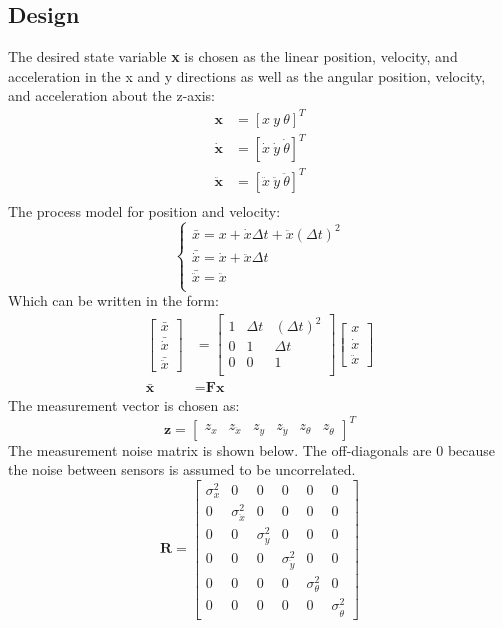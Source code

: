 \documentclass[12pt,letterpaper,titlepage]{report}
\begin{document}
\subsection{Design}
The desired state variable \textbf{x} is chosen as the linear position, velocity, and acceleration in the x and y directions as well as the angular position, velocity, and acceleration about the z-axis:
\begin{align*}
\textbf{x} &= [x\ y\ \theta]^T\\
\dot{\textbf{x}} &= [\dot{x}\ \dot{y}\ \dot{\theta}]^T\\
\ddot{\textbf{x}} &= [\ddot{x}\ \ddot{y}\ \ddot{\theta}]^T\\
\end{align*}
The process model for position and velocity:
\[ \begin{cases} 
	\bar{x}=x+\dot{x}\Delta t+\ddot{x}(\Delta t)^2\\
	\bar{\dot{x}}=\dot{x}+\ddot{x}\Delta t\\
	\bar{\ddot{x}}=\ddot{x}\\
\end{cases} \]
Which can be written in the form:
\begin{align*}
\begin{bmatrix}\bar{x}\\ \bar{\dot{x}}\\ \bar{\ddot{x}} \end{bmatrix} &=
\begin{bmatrix}1 & \Delta t & (\Delta t)^2 \\
0 & 1 & \Delta t \\
0 & 0 & 1 \\\end{bmatrix}
\begin{bmatrix}x\\ \dot{x}\\ \ddot{x} \end{bmatrix}\\ 
\bar{\textbf{x}}&=\textbf{F}\textbf{x}
\end{align*}
The measurement vector is chosen as:
\[\textbf{z}=
\begin{bmatrix}z_x & z_{\ddot{x}} & z_y & z_{\ddot{y}} & z_{\theta} & z_{\dot{\theta}} \end{bmatrix}^T\]
The measurement noise matrix is shown below. The off-diagonals are 0 because the noise between sensors is assumed to be uncorrelated.
\[\textbf{R}=
\begin{bmatrix}\sigma^2_x & 0 & 0 & 0 &0 & 0\\
0 & \sigma^2_{\ddot{x}} & 0 & 0 & 0 & 0\\
0 & 0 & \sigma^2_y & 0 & 0 & 0 \\
0 & 0 & 0 & \sigma^2_{\ddot{y}} & 0 & 0\\
0 & 0 & 0 & 0 & \sigma^2_{\theta} & 0\\
0 & 0 & 0 & 0 & 0 & \sigma^2_{\dot{\theta}} \end{bmatrix}\]
\end{document}
